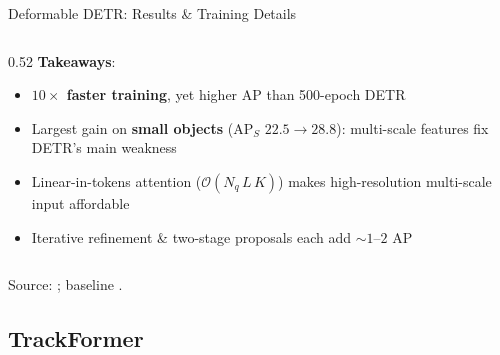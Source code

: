 \begin{frame}{Deformable DETR: Results \& Training Details}
\begin{columns}
\begin{column}{0.52\textwidth}
      \vspace{0.6em}
      \textbf{Takeaways}:
      \begin{itemize}
        \item \textbf{$10\times$ faster training}, yet higher AP than 500-epoch DETR
        \item Largest gain on \textbf{small objects} (AP$_S$ $22.5\!\to\!28.8$): multi-scale features fix DETR's main weakness
        \item Linear-in-tokens attention ($\mathcal{O}(N_q\,L\,K)$) makes high-resolution multi-scale input affordable
        \item Iterative refinement \& two-stage proposals each add $\sim\!1$--$2$ AP
      \end{itemize}
    \end{column}
  \end{columns}

  \vspace{0.3em}
  {\scriptsize Source: \textcite{zhu2021deformabledetr}; baseline \textcite{carion2020detr}.}
\end{frame}

\subsection{TrackFormer}

